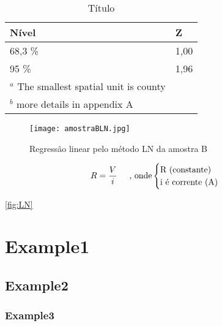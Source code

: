 

\begin{table}[H]
	\centering
	\caption{Título}
	\label{tab:example}
	\begin{tabular}{l l}
		\hline
		    Nível & Z \\ 
		\hline
		68,3 \%      &   1,00\\
		95 \%        &   1,96\\
		\hline
		\footnotesize{$^a$ The smallest spatial unit is county} \\
		\footnotesize{ $^b$ more details in appendix A}\\
	\end{tabular}
\end{table}



\begin{figure}[H]
    \centering
    \caption {Regressão linear pelo método LN da amostra B}
    \texttt{[image: amostraBLN.jpg]}
    \label{fig:example}
\end{figure}


\begin{equation}
     R = \frac{V}{i} 
     \textrm{\hspace{0.5cm}, onde}
    \begin{cases}
        \text{R (constante)} \\
        \text{i é corrente (A)}
    \end{cases}
    \label{eq:leiohm}   
\end{equation}






\ref{fig:LN}



\cite{Cataluna2012}



\section{Example1}
\subsection{Example2}
\subsubsection{Example3}



